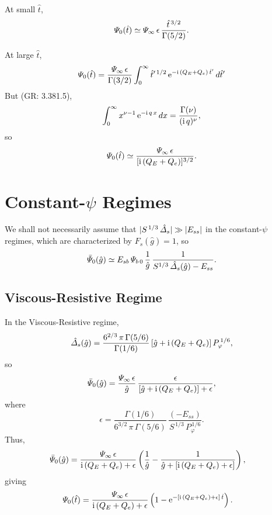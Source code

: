 \documentclass[titlepage=false,12pt]{article}
\begin{document}
At small $\hat{t}$,
\begin{equation}
{\mit\Psi}_0(\hat{t}) \simeq {\mit\Psi}_\infty\,\epsilon\,\frac{\hat{t}^{\,3/2}}{\Gamma(5/2)}.
\end{equation}

At large $\hat{t}$, 
\begin{equation}
{\mit\Psi}_0(\hat{t}) =\frac{{\mit\Psi}_\infty\,\epsilon}{\Gamma(3/2)}\int_0^{\infty}
\hat{t}'^{\,1/2}\,{\rm e}^{-{\rm i}\,(Q_E+Q_e)\,\hat{t}'}\,d\hat{t}'
\end{equation}
But (GR: 3.381.5), 
\begin{equation}
\int_0^\infty x^{\nu-1}\,{\rm e}^{-{\rm i}\,q\,x}\,dx = \frac{\Gamma(\nu)}{({\rm i}\,q)^{\nu}},
\end{equation}
so 
\begin{equation}
{\mit\Psi}_0(\hat{t}) \simeq \frac{{\mit\Psi}_\infty\,\epsilon}{[{\rm i}\,(Q_E+Q_e)]^{3/2}}.
\end{equation}

\section{Constant-$\psi$ Regimes}
We shall not necessarily  assume that $|S^{\,1/3}\,\hat{\mit\Delta}_s|\gg |E_{ss}|$ in the constant-$\psi$ regimes,  which are characterized by $F_s(\hat{g})=1$, so
\begin{equation}
\bar{\mit\Psi}_0(\hat{g})
\simeq E_{sb}\,{\mit\Psi}_{b\,0}\,\frac{1}{\hat{g}}\,\frac{1}{S^{1/3}\,\hat{\mit\Delta}_s(\hat{g})-E_{ss}}.
\end{equation}

\subsection{Viscous-Resistive Regime}
In the Viscous-Resistive regime, 
\begin{equation}
\hat{\mit\Delta}_s(\hat{g}) = \frac{6^{2/3}\,\pi\,\Gamma(5/6)}{\Gamma(1/6)}\,[\hat{g}+ {\rm i}\,(Q_E+Q_e)]\,P_\varphi^{\,1/6},
\end{equation}
so
\begin{equation}
\bar{\mit\Psi}_0(\hat{g}) =\frac{{\mit\Psi}_\infty\,\epsilon}{\hat{g}}\,\frac{\epsilon}
{[\hat{g}+ {\rm i}\,(Q_E+Q_e)]+\epsilon},
\end{equation}
where
\begin{equation}
\epsilon = \frac{\Gamma(1/6)}{6^{3/2}\,\pi\,\Gamma(5/6)}\,\frac{(-E_{ss})}{S^{\,1/3}\,P_\varphi^{\,1/6}}.
\end{equation}
Thus,
\begin{align}
\bar{\mit\Psi}_0(\hat{g}) &= 
\frac{{\mit\Psi}_\infty\,\epsilon}{{\rm i}\,(Q_E+Q_e)+\epsilon}\left(\frac{1}{\hat{g}} - \frac{1}{\hat{g} +[ {\rm i}\,(Q_E+Q_e)+\epsilon]}\right),
\end{align}
giving
\begin{align}
{\mit\Psi}_0(\hat{t}) &= \frac{{\mit\Psi}_\infty\,\epsilon}{{\rm i}\,(Q_E+Q_e)+\epsilon}\left(1 - {\rm e}^{- [{\rm i}\,(Q_E+Q_e)+\epsilon]\,\hat{t}}\right).
\end{align}
\end{document}
